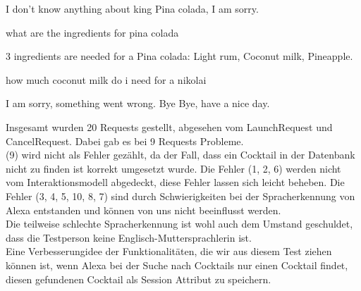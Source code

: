 \documentclass[12pt,letterpaper]{article}
\begin{document}
\begin{dialogue}
 I don't know anything about king Pina colada, I am sorry.\\

 what are the ingredients for pina colada

 3 ingredients are needed for a Pina colada: Light rum, Coconut milk, Pineapple.

 how much coconut milk do i need for a nikolai\\

 I am sorry, something went wrong.
 Bye
 Bye, have a nice day.
\end{dialogue}

Insgesamt wurden 20 Requests gestellt, abgesehen vom LaunchRequest und CancelRequest. Dabei gab es bei 9 Requests Probleme. \\(9) wird nicht als Fehler gezählt, da der Fall, dass ein Cocktail in der Datenbank nicht zu finden ist korrekt umgesetzt wurde. Die Fehler (1, 2, 6) werden nicht vom Interaktionsmodell abgedeckt, diese Fehler lassen sich leicht beheben. Die Fehler (3, 4, 5, 10, 8, 7) sind durch Schwierigkeiten bei der Spracherkennung von Alexa entstanden und können von uns nicht beeinflusst werden.\\ Die teilweise schlechte Spracherkennung ist wohl auch dem Umstand geschuldet, dass die Testperson keine Englisch-Muttersprachlerin ist. \\
Eine Verbesserungidee der Funktionalitäten, die wir aus diesem Test ziehen können ist, wenn Alexa bei der Suche nach Cocktails nur einen Cocktail findet, diesen gefundenen Cocktail als Session Attribut zu speichern. \\
\end{document}
